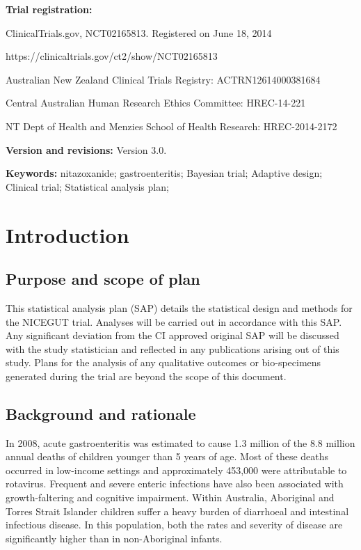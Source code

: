 \documentclass[a4paper]{article}
\begin{document}
\clearpage

{\bf Trial registration:} 

\setlength{\leftskip}{1cm}ClinicalTrials.gov, NCT02165813. Registered on June 18, 2014

\setlength{\leftskip}{1cm}https://clinicaltrials.gov/ct2/show/NCT02165813

\setlength{\leftskip}{1cm}Australian New Zealand Clinical Trials Registry: ACTRN12614000381684

\setlength{\leftskip}{1cm}Central Australian Human Research
Ethics Committee: HREC-14-221

\setlength{\leftskip}{1cm}NT Dept of Health and Menzies School of Health
Research: HREC-2014-2172

\setlength{\leftskip}{0pt}
{\bf Version and revisions:} Version 3.0.

{\bf Keywords:} nitazoxanide; gastroenteritis; Bayesian trial; Adaptive design; Clinical trial; Statistical analysis plan;


\clearpage

\tableofcontents

\clearpage


\section{Introduction}

\subsection{Purpose and scope of plan}

This statistical analysis plan (SAP) details the statistical design and methods for the NICEGUT trial. 
Analyses will be carried out in accordance with this SAP. 
Any significant deviation from the CI approved original SAP will be discussed with the study statistician and reflected in any publications arising out of this study.
Plans for the analysis of any qualitative outcomes or bio-specimens generated during the trial are beyond the scope of this document.

\subsection{Background and rationale}

In 2008, acute gastroenteritis was estimated to cause 1.3 million of the 8.8 million annual deaths of children younger than 5 years of age.
Most of these deaths occurred in low-income settings and approximately 453,000 were attributable to rotavirus.
Frequent and severe enteric infections have also been associated with growth-faltering and cognitive impairment.
Within Australia, Aboriginal and Torres Strait Islander children suffer a heavy burden of diarrhoeal and intestinal infectious disease.
In this population, both the rates and severity of disease are significantly higher than in non-Aboriginal infants.
\end{document}
